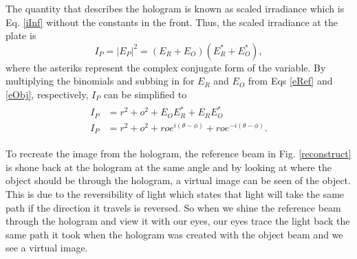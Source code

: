 \documentclass[ notitlepage, numerical, 11pt]{revtex4-1} %
\begin{document}
The quantity that describes the hologram is known as scaled irradiance which is Eq. \ref{iInf} without the constants in the front. Thus, the scaled irradiance at the plate is
\begin{equation}
I_{P} =  |E_P|^2 = (E_R + E_O) (E^*_{R} + E^*_{O}),
\label{If}
\end{equation}
where the asteriks represent the complex conjugate form of the variable.
By multiplying the binomials and subbing in for $E_R$ and $E_O$ from Eqs \ref{eRef} and \ref{eObj}, respectively, $I_P$ can be simplified to \cite{optics}
\begin{align}
\begin{split}
I_{P} &= r^2 + o^2 + E_O E^*_R + E_R E^*_O  \\
I_{P} &= r^2 + o^2 + roe^{i(\theta - \phi)} + roe^{-i(\theta - \phi)}.
\end{split}
\label{IfFinal}
\end{align}

To recreate the image from the hologram, the reference beam in Fig. \ref{reconstruct} is shone back at the hologram at the same angle and by looking at where the object should be through the hologram, a virtual image can be seen of the object. This is due to the reversibility of light which states that light will take the same path if the direction it travels is reversed. So when we shine the reference beam through the hologram and view it with our eyes, our eyes trace the light back the same path it took when the hologram was created with the object beam and we see a virtual image.
\end{document}
